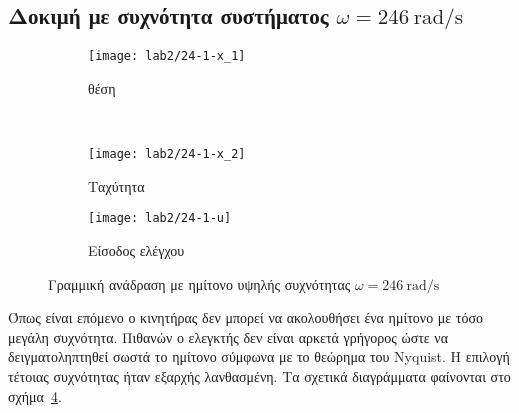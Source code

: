\subsection[Δοκιμή με συχνότητα συστήματος]{Δοκιμή με συχνότητα συστήματος $\omega = \SI{246}{\radian / \second}$}
\begin{figure}[htbp]
  \centering
  \begin{subfigure}[t]{\linewidth}
    \texttt{[image: lab2/24-1-x\_1]}
    \caption{θέση}
    \label{fig:24-1-x_1}
  \end{subfigure}\\
  \begin{subfigure}[t]{0.45\linewidth}
    \texttt{[image: lab2/24-1-x\_2]}
    \caption{Ταχύτητα}
    \label{fig:24-1-x_2}
  \end{subfigure}\hfill
  \begin{subfigure}[t]{0.45\linewidth}
    \texttt{[image: lab2/24-1-u]}
    \caption{Είσοδος ελέγχου}
    \label{fig:24-1-u}
  \end{subfigure}
  \caption[Γραμμική ανάδραση με ημίτονο υψηλής συχνότητας]{Γραμμική ανάδραση με ημίτονο υψηλής συχνότητας $\omega = \SI{246}{\radian / \second}$}
  \label{fig:24-1}
\end{figure}
Όπως είναι επόμενο ο κινητήρας δεν μπορεί να ακολουθήσει ένα ημίτονο με τόσο μεγάλη συχνότητα.
Πιθανών ο ελεγκτής δεν είναι αρκετά γρήγορος ώστε να δειγματοληπτηθεί σωστά το ημίτονο σύμφωνα με το θεώρημα του
Nyquist.
Η επιλογή τέτοιας συχνότητας ήταν εξαρχής λανθασμένη.
Τα σχετικά διαγράμματα φαίνονται στο σχήμα~\ref{fig:24-1}.

